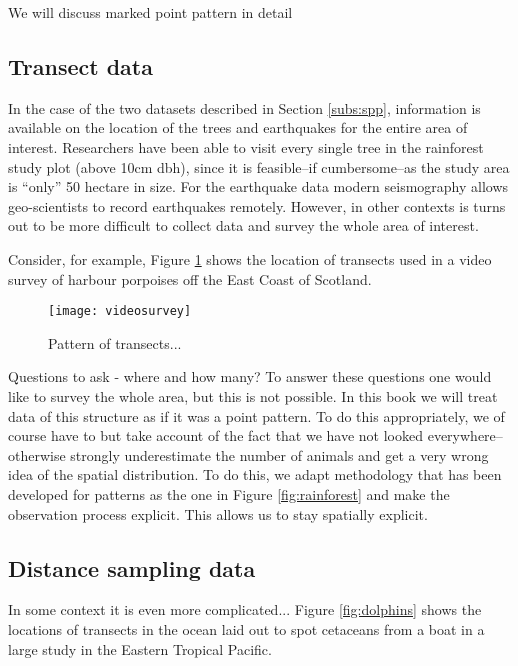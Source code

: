 We will discuss marked point pattern in detail

\subsection{Transect data}
In the case of the two datasets described in Section \ref{subs:spp}, information is available on the location of the trees and earthquakes for the entire area of interest. Researchers have been able to visit every single tree in the rainforest study plot  (above 10cm dbh), since it is feasible--if cumbersome--as the study area is ``only'' 50 hectare  in size. For the earthquake data modern  seismography allows geo-scientists to record earthquakes remotely. However, in other contexts is turns out to be more difficult to collect data and survey the whole area of interest.
	
Consider, for example, Figure \ref{fig:video} shows the location of transects used in a video survey of harbour porpoises off the East Coast of Scotland. 


\begin{figure}
\begin{center}
\texttt{[image: videosurvey]}
\caption{\label{fig:video} Pattern of transects...}
\end{center}
\end{figure}

Questions to ask - where and how many? To answer these questions one would like to survey the whole area, but this is not possible. 
In this book we will treat data of this structure as if it was a point pattern. To do this appropriately, we of course have to but take account of the  fact that we have not looked everywhere-- otherwise strongly underestimate the number of animals and get a very wrong idea of the spatial distribution. To do this, we adapt methodology that has been developed for patterns as the one in Figure \ref{fig:rainforest} and make the observation process explicit. This allows us to stay spatially explicit.

\subsection{Distance sampling data}
In some context it is even more complicated...
Figure \ref{fig:dolphins} shows the locations of transects in the ocean laid out to spot cetaceans from a boat in a large study in the Eastern Tropical Pacific. 

